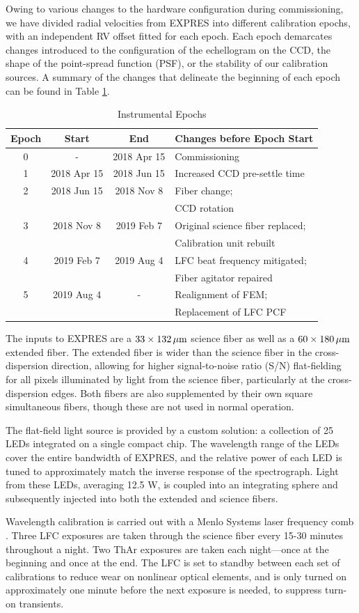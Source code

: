 Owing to various changes to the hardware configuration during commissioning, we have divided radial velocities from EXPRES into different calibration epochs, with an independent RV offset fitted for each epoch. Each epoch demarcates changes introduced to the configuration of the echellogram on the CCD, the shape of the point-spread function (PSF), or the stability of our calibration sources. A summary of the changes that delineate the beginning of each epoch can be found in Table \ref{tab:epochs}.

\begin{table}[ht!]
\centering
\caption{Instrumental Epochs\label{tab:epochs}}
\begin{tabular}{cccl}
\hline
Epoch & Start & End & Changes before Epoch Start \tabularnewline
\hline
0 & - & 2018 Apr 15 & Commissioning \tabularnewline
1 & 2018 Apr 15 & 2018 Jun 15 & Increased CCD pre-settle time \tabularnewline
2 & 2018 Jun 15 & 2018 Nov 8 & Fiber change; \tabularnewline
 & & & CCD rotation \tabularnewline
3 & 2018 Nov 8 & 2019 Feb 7 & Original science fiber replaced; \tabularnewline
 & & &  Calibration unit rebuilt \tabularnewline
4 & 2019 Feb 7 & 2019 Aug 4 & LFC beat frequency mitigated; \tabularnewline
 & & &  Fiber agitator repaired \tabularnewline
5 & 2019 Aug 4 & - & Realignment of FEM; \tabularnewline
& & &  Replacement of LFC PCF
\tabularnewline
\hline
\end{tabular}
\end{table}

The inputs to EXPRES are a $33 \times 132 {{\,\mathrm{\mu{} m}}}$ science fiber as well as a $60 \times 180 {{\,\mathrm{\mu{} m}}}$ extended fiber. The extended fiber is wider than the science fiber in the cross-dispersion direction, allowing for higher signal-to-noise ratio (S/N) flat-fielding for all pixels illuminated by light from the science fiber, particularly at the cross-dispersion edges. Both fibers are also supplemented by their own square simultaneous fibers, though these are not used in normal operation.

The flat-field light source is provided by a custom solution: a collection of 25 LEDs integrated on a single compact chip. The wavelength range of the LEDs cover the entire bandwidth of EXPRES, and the relative power of each LED is tuned to approximately match the inverse response of the spectrograph. Light from these LEDs, averaging 12.5 W, is coupled into an integrating sphere and subsequently injected into both the extended and science fibers.

Wavelength calibration is carried out with a Menlo Systems laser frequency comb \citep[LFC; similar to those in][]{steinmetz_laser_2008,probst_relative_2016}. Three LFC exposures are taken through the science fiber every 15-30 minutes throughout a night.  Two ThAr exposures are taken each night---once at the beginning and once at the end. The LFC is set to standby between each set of calibrations to reduce wear on nonlinear optical elements, and is only turned on approximately one minute before the next exposure is needed, to suppress turn-on transients.

